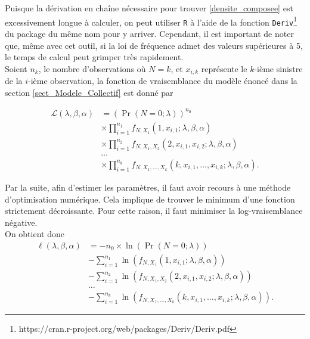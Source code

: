 \documentclass{article}
\begin{document}
		Puisque la dérivation en chaîne nécessaire pour trouver \eqref{densite_composee} est excessivement longue à calculer, on peut utiliser \texttt{R} à l'aide de la fonction \texttt{Deriv}\footnote{https://cran.r-project.org/web/packages/Deriv/Deriv.pdf} du package du même nom pour y arriver. Cependant, il est important de noter que, même avec cet outil, si la loi de fréquence admet des valeurs supérieures à 5, le temps de calcul peut grimper très rapidement.\\
		
		Soient $n_k$, le nombre d'observations où $N = k$, et $x_{i,k}$ représente le $k$-ième sinistre de la $i$-ième observation,
		la fonction de vraisemblance du modèle énoncé dans la section \ref{sect_Modele_Collectif} est donné par
		
		\begin{align*}
		 \mathcal{L}(\lambda, \beta, \alpha) 
		 &= \left( \Pr (N=0 ; \lambda)\right)^{n_0} \\
		 & \times \prod_{i = 1}^{n_1} f_{N,X_1}(1,x_{i,1};\lambda,\beta, \alpha)\\
		 & \times \prod_{i = 1}^{n_2} f_{N,X_1,X_2}(2,x_{i,1},x_{i,2};\lambda,\beta, \alpha)\\
		 & \dots\\
		 & \times \prod_{i = 1}^{n_k} f_{N,X_1,\dots,X_k}(k,x_{i,1},\dots,x_{i,k};\lambda,\beta, \alpha).
		\end{align*}
		
		Par la suite, afin d'estimer les paramètres, il faut avoir recours à une méthode d'optimisation numérique. Cela implique de trouver le minimum d'une fonction strictement décroissante. Pour cette raison, il faut minimiser la log-vraisemblance négative.\\
		
		On obtient donc
		\begin{align}
		\ell(\lambda, \beta, \alpha) 
		&=  - n_0 \times \ln \left( \Pr (N=0 ; \lambda) \right) \nonumber\\
		& - \sum_{i=1}^{n_1} \ln \left(f_{N,X_1}(1,x_{i,1};\lambda,\beta, \alpha) \right) \nonumber \\
		& - \sum_{i=1}^{n_2} \ln \left(f_{N,X_1,X_2}(2,x_{i,1},x_{i,2};\lambda,\beta, \alpha)\right) \label{logLikelyhood_neg} \\
		& \dots \nonumber\\
		& - \sum_{i=1}^{n_k} \ln \left( f_{N,X_1,\dots,X_k}(k,x_{i,1},\dots,x_{i,k};\lambda,\beta, \alpha)\right). \nonumber
		\end{align}
		
\end{document}
